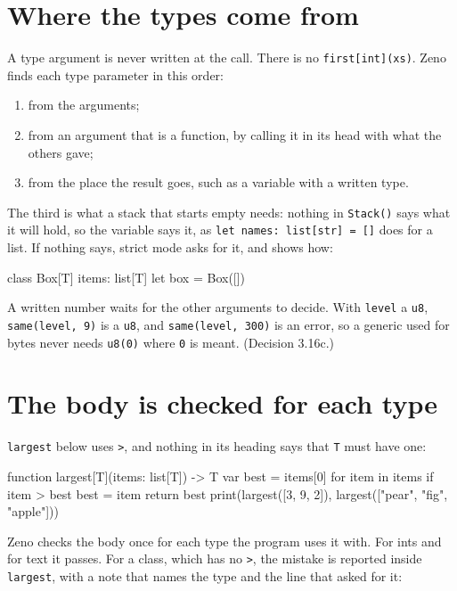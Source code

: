 \section{Where the types come from}

A type argument is never written at the call. There is no
\verb|first[int](xs)|. Zeno finds each type parameter in this order:

\begin{enumerate}
\item from the arguments;
\item from an argument that is a function, by calling it in its head
  with what the others gave;
\item from the place the result goes, such as a variable with a
  written type.
\end{enumerate}

The third is what a stack that starts empty needs: nothing in
\verb|Stack()| says what it will hold, so the variable says it, as
\verb|let names: list[str] = []| does for a list. If nothing says,
strict mode asks for it, and shows how:

\begin{zeno}[fails=yes, cmd=zeno check --strict {file}]
class Box[T] {
    items: list[T]
}
let box = Box([])
\end{zeno}

A written number waits for the other arguments to decide. With
\verb|level| a \verb|u8|, \verb|same(level, 9)| is a \verb|u8|, and
\verb|same(level, 300)| is an error, so a generic used for bytes never
needs \verb|u8(0)| where \verb|0| is meant. (Decision 3.16c.)

\section{The body is checked for each type}

\verb|largest| below uses \verb|>|, and nothing in its heading says
that \verb|T| must have one:

\begin{zeno}
function largest[T](items: list[T]) -> T {
    var best = items[0]
    for item in items {
        if item > best {
            best = item
        }
    }
    return best
}
print(largest([3, 9, 2]), largest(["pear", "fig", "apple"]))
\end{zeno}

Zeno checks the body once for each type the program uses it with. For
ints and for text it passes. For a class, which has no \verb|>|, the
mistake is reported inside \verb|largest|, with a note that names the
type and the line that asked for it:

